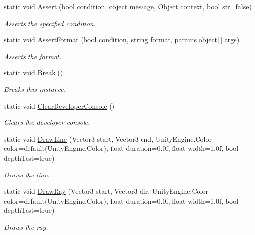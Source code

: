\begin{DoxyCompactItemize}
static void \hyperlink{class_lerp2_a_p_i_1_1___debug_1_1_debug_a8d513da89e4ab831ae232095d25e4f1b}{Assert} (bool condition, object message, Object context, bool str=false)
\begin{DoxyCompactList}\small\item\em Asserts the specified condition. \end{DoxyCompactList}\item 
static void \hyperlink{class_lerp2_a_p_i_1_1___debug_1_1_debug_ab1b8544c0ab696578918f61bea2545b9}{Assert\+Format} (bool condition, string format, params object\mbox{[}$\,$\mbox{]} args)
\begin{DoxyCompactList}\small\item\em Asserts the format. \end{DoxyCompactList}\item 
static void \hyperlink{class_lerp2_a_p_i_1_1___debug_1_1_debug_aed76184b1569cf1e95bd312da4dbbb99}{Break} ()
\begin{DoxyCompactList}\small\item\em Breaks this instance. \end{DoxyCompactList}\item 
static void \hyperlink{class_lerp2_a_p_i_1_1___debug_1_1_debug_abe04aeefdd8d2935c1a66b766a277b73}{Clear\+Developer\+Console} ()
\begin{DoxyCompactList}\small\item\em Clears the developer console. \end{DoxyCompactList}\item 
static void \hyperlink{class_lerp2_a_p_i_1_1___debug_1_1_debug_af6cd11f43cd59068a3c0213386c71d07}{Draw\+Line} (Vector3 start, Vector3 end, Unity\+Engine.\+Color color=default(Unity\+Engine.\+Color), float duration=0.\+0f, float width=1.\+0f, bool depth\+Test=true)
\begin{DoxyCompactList}\small\item\em Draws the line. \end{DoxyCompactList}\item 
static void \hyperlink{class_lerp2_a_p_i_1_1___debug_1_1_debug_a8664d6b86a6f0ef87d69ba4090fc572e}{Draw\+Ray} (Vector3 start, Vector3 dir, Unity\+Engine.\+Color color=default(Unity\+Engine.\+Color), float duration=0.\+0f, float width=1.\+0f, bool depth\+Test=true)
\begin{DoxyCompactList}\small\item\em Draws the ray. \end{DoxyCompactList}\item 

\end{DoxyCompactItemize}
